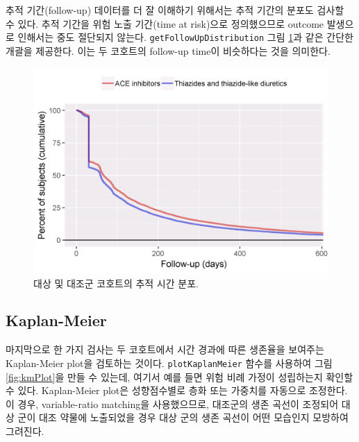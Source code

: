 \documentclass[11pt]{book}
\theoremstyle{definition}
\theoremstyle{definition}
\theoremstyle{definition}
\theoremstyle{remark}
\begin{document}
추적 기간(follow-up) 데이터를 더 잘 이해하기 위해서는 추적 기간의 분포도
검사할 수 있다. 추적 기간을 위험 노출 기간(time at risk)으로
정의했으므로 outcome 발생으로 인해서는 중도 절단되지 않는다.
\texttt{getFollowUpDistribution} 그림 \ref{fig:followUp}과 같은 간단한
개괄을 제공한다. 이는 두 코호트의 follow-up time이 비슷하다는 것을
의미한다.

\begin{figure}

{\centering \includegraphics[width=0.8\linewidth]{images/PopulationLevelEstimation/followUp} 

}

\caption{대상 및 대조군 코호트의 추적 시간 분포.}\label{fig:followUp}
\end{figure}

\subsection{Kaplan-Meier}\label{kaplan-meier}

마지막으로 한 가지 검사는 두 코호트에서 시간 경과에 따른 생존율을
보여주는 Kaplan-Meier plot을 검토하는 것이다. \texttt{plotKaplanMeier}
함수를 사용하여 그림 \ref{fig:kmPlot}을 만들 수 있는데, 여기서 예를 들면
위험 비례 가정이 성립하는지 확인할 수 있다. Kaplan-Meier plot은
성향점수별로 층화 또는 가중치를 자동으로 조정한다. 이 경우,
variable-ratio matching을 사용했으므로, 대조군의 생존 곡선이 조정되어
대상 군이 대조 약물에 노출되었을 경우 대상 군의 생존 곡선이 어떤
모습인지 모방하여 그려진다. 
\end{document}
